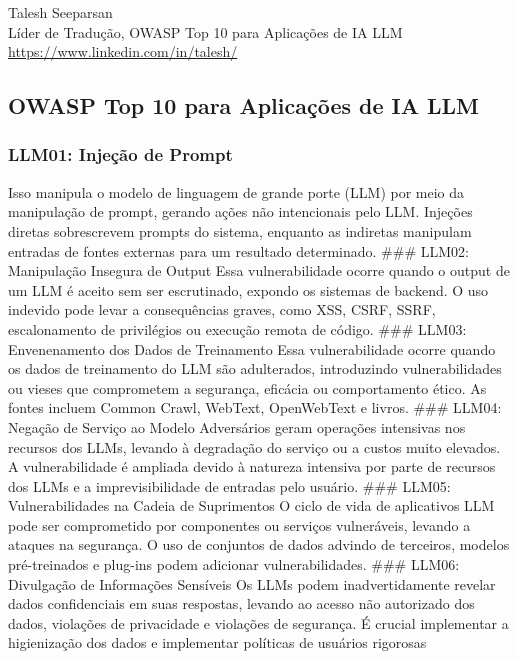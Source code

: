 \documentclass[
]{article}
\begin{document}
Talesh Seeparsan\\
Líder de Tradução, OWASP Top 10 para Aplicações de IA LLM\\
\url{https://www.linkedin.com/in/talesh/}

\subsection{OWASP Top 10 para Aplicações de IA
LLM}\label{owasp-top-10-para-aplicauxe7uxf5es-de-ia-llm}

\subsubsection{LLM01: Injeção de
Prompt}\label{llm01-injeuxe7uxe3o-de-prompt}

Isso manipula o modelo de linguagem de grande porte (LLM) por meio da
manipulação de prompt, gerando ações não intencionais pelo LLM. Injeções
diretas sobrescrevem prompts do sistema, enquanto as indiretas manipulam
entradas de fontes externas para um resultado determinado. \#\#\# LLM02:
Manipulação Insegura de Output Essa vulnerabilidade ocorre quando o
output de um LLM é aceito sem ser escrutinado, expondo os sistemas de
backend. O uso indevido pode levar a consequências graves, como XSS,
CSRF, SSRF, escalonamento de privilégios ou execução remota de código.
\#\#\# LLM03: Envenenamento dos Dados de Treinamento Essa
vulnerabilidade ocorre quando os dados de treinamento do LLM são
adulterados, introduzindo vulnerabilidades ou vieses que comprometem a
segurança, eficácia ou comportamento ético. As fontes incluem Common
Crawl, WebText, OpenWebText e livros. \#\#\# LLM04: Negação de Serviço
ao Modelo Adversários geram operações intensivas nos recursos dos LLMs,
levando à degradação do serviço ou a custos muito elevados. A
vulnerabilidade é ampliada devido à natureza intensiva por parte de
recursos dos LLMs e a imprevisibilidade de entradas pelo usuário. \#\#\#
LLM05: Vulnerabilidades na Cadeia de Suprimentos O ciclo de vida de
aplicativos LLM pode ser comprometido por componentes ou serviços
vulneráveis, levando a ataques na segurança. O uso de conjuntos de dados
advindo de terceiros, modelos pré-treinados e plug-ins podem adicionar
vulnerabilidades. \#\#\# LLM06: Divulgação de Informações Sensíveis Os
LLMs podem inadvertidamente revelar dados confidenciais em suas
respostas, levando ao acesso não autorizado dos dados, violações de
privacidade e violações de segurança. É crucial implementar a
higienização dos dados e implementar políticas de usuários rigorosas
\end{document}
